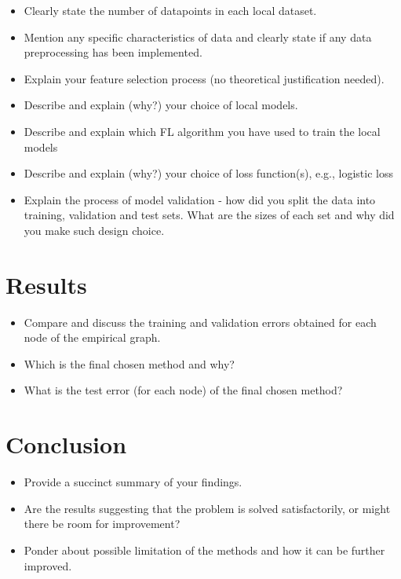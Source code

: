\documentclass{article}
\begin{document}
\begin{itemize} 
\item Clearly state the number of datapoints in each local dataset. 
\item Mention any specific characteristics of data and clearly state if any data preprocessing has been implemented.
\item Explain your feature selection process (no theoretical justification needed).
\item Describe and explain (why?) your choice of local models. 
\item Describe and explain which FL algorithm you have used to train the local models \cite[Sec. 9]{lecnotesfl}
\item Describe and explain (why?) your choice of loss function(s), e.g., logistic loss
\item Explain the process of model validation - how did you split the data into training, validation and test sets. What are the sizes of each set and why did
you make such design choice.
\end{itemize} 

\section{Results} 
\label{sec_results} 

\begin{itemize} 
	\item Compare and discuss the training and validation errors obtained for each node of the empirical graph. 
	\item Which is the final chosen method and why?
	\item What is the test error (for each node) of the final chosen method?
\end{itemize} 

\section{Conclusion}

\begin{itemize} 
\item Provide a succinct summary of your findings.
\item Are the results suggesting that the problem is solved satisfactorily, or might
there be room for improvement?
\item Ponder about possible limitation of the methods and how it can be further improved.
\end{itemize} 







\end{document}

